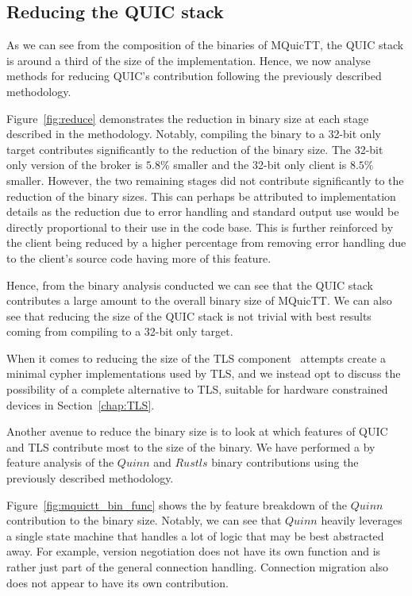 \subsection{Reducing the QUIC stack}

As we can see from the composition of the binaries of MQuicTT, the QUIC stack is around a third of the size of the implementation.
Hence, we now analyse methods for reducing QUIC's contribution following the previously described methodology.

Figure~\ref{fig:reduce} demonstrates the reduction in binary size at each stage described in the methodology.
Notably, compiling the binary to a 32-bit only target contributes significantly to the reduction of the binary size.
The 32-bit only version of the broker is $5.8\%$ smaller and the 32-bit only client is $8.5\%$ smaller.
However, the two remaining stages did not contribute significantly to the reduction of the binary sizes.
This can perhaps be attributed to implementation details as the reduction due to error handling and standard output use would be directly proportional to their use in the code base.
This is further reinforced by the client being reduced by a higher percentage from removing error handling due to the client's source code having more of this feature.

Hence, from the binary analysis conducted we can see that the QUIC stack contributes a large amount to the overall binary size of MQuicTT.
We can also see that reducing the size of the QUIC stack is not trivial with best results coming from compiling to a 32-bit only target.

When it comes to reducing the size of the TLS component~\cite{eggert_towards_2020} attempts create a minimal cypher implementations used by TLS, and we instead opt to discuss the possibility of a complete alternative to TLS, suitable for hardware constrained devices in Section~\ref{chap:TLS}.

Another avenue to reduce the binary size is to look at which features of QUIC and TLS contribute most to the size of the binary.
We have performed a by feature analysis of the $Quinn$ and $Rustls$ binary contributions using the previously described methodology.

Figure~\ref{fig:mquictt_bin_func} shows the by feature breakdown of the $Quinn$ contribution to the binary size.
Notably, we can see that $Quinn$ heavily leverages a single state machine that handles a lot of logic that may be best abstracted away.
For example, version negotiation does not have its own function and is rather just part of the general connection handling.
Connection migration also does not appear to have its own contribution.

